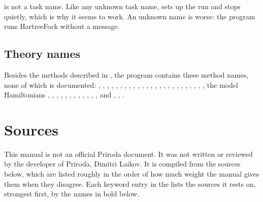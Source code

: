 \documentclass[letterpaper,10pt,english,openany,oneside]{sphinxmanual}
\begin{document}
\sphinxAtStartPar
{} is not a task name. Like any unknown task name,  sets up the run and stops quietly, which is
why it seems to work. An unknown  name is worse: the program runs Hartree\textendash{}Fock without a message.




\section{Theory names}
\label{\detokenize{binary-keywords:theory-names}}
\sphinxAtStartPar
Besides the methods described in {\hyperref[\detokenize{reference/control:control-theory}]{}}, the program contains these method names, none of
which is documented: , , , , , , , , , ,
, , , , , , , , ,
, , , , , , the model Hamiltonians , , ,
, , , , , , , , , and , , .



\sphinxstepscope


\chapter{Sources}
\label{\detokenize{sources:sources}}\label{\detokenize{sources:id1}}\label{\detokenize{sources::doc}}
\sphinxAtStartPar
This manual is not an official Priroda document. It was not written or reviewed by the developer of Priroda,
Dimitri Laikov. It is compiled from the sources below, which are listed roughly in the order of how much weight the
manual gives them when they disagree. Each keyword entry in the {\hyperref[\detokenize{reference/index::doc}]{}} lists the
sources it rests on, strongest first, by the names in bold below.
\end{document}
